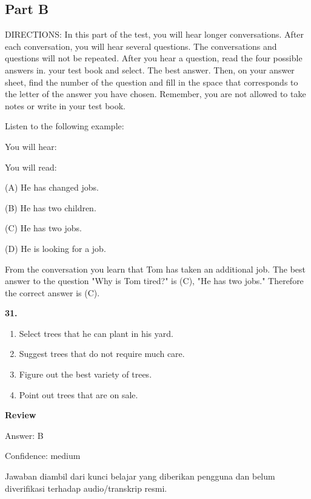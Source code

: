 \documentclass[12pt]{article}
\begin{document}
\subsection*{Part B}
DIRECTIONS: In this part of the test, you will hear longer conversations. After each conversation, you will hear several questions. The conversations and questions will not be repeated. After you hear a question, read the four possible answers in. your test book and select. The best answer. Then, on your answer sheet, find the number of the question and fill in the space that corresponds to the letter of the answer you have chosen. Remember, you are not allowed to take notes or write in your test book.\par
\begin{exampleblock}
Listen to the following example:\par
You will hear:\par
You will read:\par
(A) He has changed jobs.\par
(B) He has two children.\par
(C) He has two jobs.\par
(D) He is looking for a job.\par
From the conversation you learn that Tom has taken an additional job. The best answer to the question "Why is Tom tired?" is (C), "He has two jobs." Therefore the correct answer is (C).\par
\end{exampleblock}
\noindent\textbf{31.}
\begin{enumerate}[label=(\Alph*),leftmargin=*,itemsep=0.2em]
\item Select trees that he can plant in his yard.
\item Suggest trees that do not require much care.
\item Figure out the best variety of trees.
\item Point out trees that are on sale.
\end{enumerate}
\par
\begingroup
\setlength{\parskip}{0pt}
\setlength{\parindent}{0pt}
\textbf{Review}\par
Answer: B\par
Confidence: medium\par
Jawaban diambil dari kunci belajar yang diberikan pengguna dan belum diverifikasi terhadap audio/transkrip resmi.\par
\endgroup
\par
\vspace{0.25\baselineskip}
\end{document}

